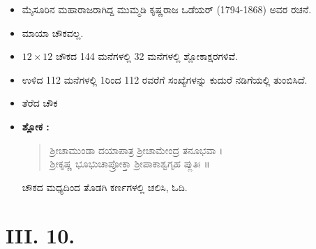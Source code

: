 \begin{itemize}
	\item ಮೈಸೂರಿನ ಮಹಾರಾಜರಾಗಿದ್ದ ಮುಮ್ಮಡಿ ಕೃಷ್ಣರಾಜ ಒಡೆಯರ್ (1794-1868) ಅವರ ರಚನೆ.
	\item ಮಾಯಾ ಚೌಕವಲ್ಲ.
	\item $12 \times 12$ ಚೌಕದ 144 ಮನೆಗಳಲ್ಲಿ 32 ಮನೆಗಳಲ್ಲಿ ಶ್ಲೋಕಾಕ್ಷರಗಳಿವೆ.
	\item ಉಳಿದ 112 ಮನೆಗಳಲ್ಲಿ 1ರಿಂದ 112 ರವರೆಗೆ ಸಂಖ್ಯೆಗಳನ್ನು ಕುದುರೆ ನಡಿಗೆಯಲ್ಲಿ ತುಂಬಿಸಿದೆ.
	\item ತೆರೆದ ಚೌಕ
	\item \textbf{ಶ್ಲೋಕ :} 
	\begin{quote}
	ಶ್ರೀಚಾಮುಂಡಾ ದಯಾಪಾತ್ರ ಶ್ರೀಚಾಮೇಂದ್ರ ತನೂಭವಾ ।\\
	ಶ್ರೀಕೃಷ್ಣ ಭೂಭುಚಾಪ್ರೋಕ್ತಾ ಶ್ರೀಪಾಕಾಶ್ವಗೃಹ ಪ್ಲುತಿಃ ॥
	\end{quote}
	ಚೌಕದ ಮಧ್ಯದಿಂದ ತೊಡಗಿ ಕರ್ಣಗಳಲ್ಲಿ ಚಲಿಸಿ, ಓದಿ.
\end{itemize}

\section*{ III. 10.}
~
\vskip -1.6cm

